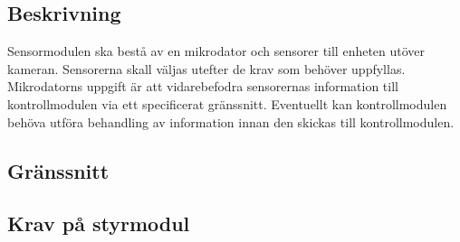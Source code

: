 \documentclass[kravspec/krav.tex]{subfiles}
\begin{document}
\subsection{Beskrivning}
Sensormodulen ska bestå av en mikrodator och sensorer till enheten utöver
kameran. Sensorerna skall väljas utefter de krav som behöver uppfyllas.
Mikrodatorns uppgift är att vidarebefodra sensorernas information till
kontrollmodulen via ett specificerat gränssnitt. Eventuellt kan kontrollmodulen
behöva utföra behandling av information innan den skickas till kontrollmodulen.

\subsection{Gränssnitt}
\subsection{Krav på styrmodul}
\begin{reqlist}
\end{reqlist}
\end{document}
